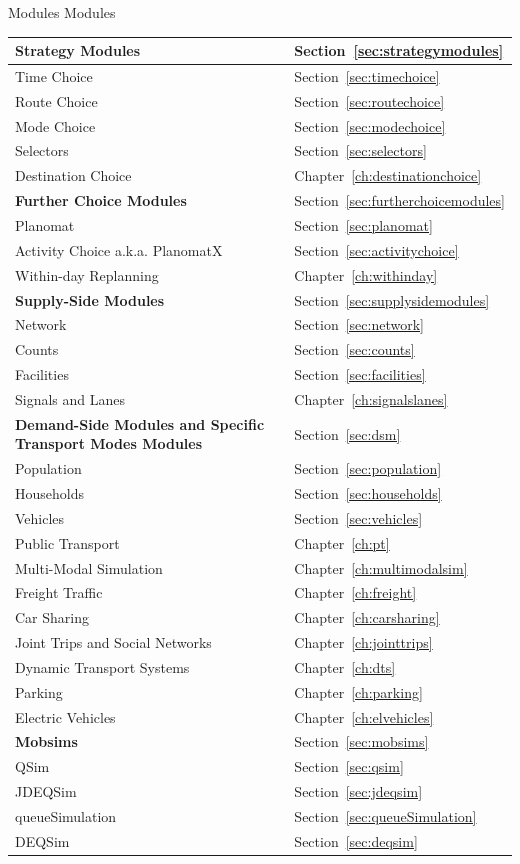 %
\createtable%
{Modules}%
{Modules}%
{\label{tab:modules}}%
{%
  \begin{tabular}[c]{|l|l|}
	\hline
	\textbf{Strategy Modules} & Section~\ref{sec:strategymodules} \\
	\hline
	Time Choice & Section~\ref{sec:timechoice} \\
	Route Choice & Section~\ref{sec:routechoice} \\
	Mode Choice & Section~\ref{sec:modechoice} \\
	Selectors & Section~\ref{sec:selectors} \\
	Destination Choice & Chapter~\ref{ch:destinationchoice} \\
	\hline
	\textbf{Further Choice Modules} & Section~\ref{sec:furtherchoicemodules} \\
	\hline
	Planomat & Section~\ref{sec:planomat} \\
	Activity Choice a.k.a. PlanomatX & Section~\ref{sec:activitychoice} \\
	Within-day Replanning & Chapter~\ref{ch:withinday} \\
	\hline
	\textbf{Supply-Side Modules} & Section~\ref{sec:supplysidemodules} \\
	\hline
	Network & Section~\ref{sec:network} \\
	Counts & Section~\ref{sec:counts} \\
	Facilities & Section~\ref{sec:facilities} \\
	Signals and Lanes & Chapter~\ref{ch:signalslanes} \\
	\hline
	\textbf{Demand-Side Modules and Specific Transport Modes Modules} & Section~\ref{sec:dsm} \\
	\hline
	Population & Section~\ref{sec:population} \\
	Households & Section~\ref{sec:households} \\
	Vehicles & Section~\ref{sec:vehicles} \\
	Public Transport & Chapter~\ref{ch:pt} \\
	Multi-Modal Simulation & Chapter~\ref{ch:multimodalsim} \\
	Freight Traffic & Chapter~\ref{ch:freight} \\
	Car Sharing & Chapter~\ref{ch:carsharing} \\
	Joint Trips and Social Networks & Chapter~\ref{ch:jointtrips} \\
	Dynamic Transport Systems & Chapter~\ref{ch:dts} \\
	Parking & Chapter~\ref{ch:parking} \\
	Electric Vehicles & Chapter~\ref{ch:elvehicles} \\
	\hline
	\textbf{Mobsims} & Section~\ref{sec:mobsims} \\
	\hline
	QSim & Section~\ref{sec:qsim} \\
	JDEQSim & Section~\ref{sec:jdeqsim} \\
	queueSimulation & Section~\ref{sec:queueSimulation} \\
	DEQSim & Section~\ref{sec:deqsim} \\
	\hline
	\end{tabular}
}%
{}

